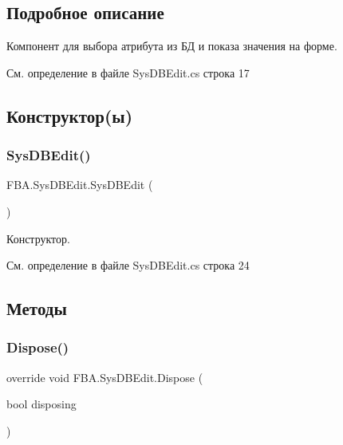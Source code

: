 \subsection{Подробное описание}
Компонент для выбора атрибута из БД и показа значения на форме. 



См. определение в файле Sys\+D\+B\+Edit.\+cs строка 17



\subsection{Конструктор(ы)}
\mbox{\label{class_f_b_a_1_1_sys_d_b_edit_afb61c970db1b5f88eb9c1edf6de88763}} 
\subsubsection{\texorpdfstring{Sys\+D\+B\+Edit()}{SysDBEdit()}}
{\footnotesize\ttfamily F\+B\+A.\+Sys\+D\+B\+Edit.\+Sys\+D\+B\+Edit (\begin{DoxyParamCaption}{ }\end{DoxyParamCaption})}



Конструктор. 



См. определение в файле Sys\+D\+B\+Edit.\+cs строка 24



\subsection{Методы}
\mbox{\label{class_f_b_a_1_1_sys_d_b_edit_a92ebba63c241ca90599192bd5e2fd244}} 
\subsubsection{\texorpdfstring{Dispose()}{Dispose()}}
{\footnotesize\ttfamily override void F\+B\+A.\+Sys\+D\+B\+Edit.\+Dispose (\begin{DoxyParamCaption}\item[{bool}]{disposing }\end{DoxyParamCaption})\hspace{0.3cm}{\ttfamily [protected]}}



